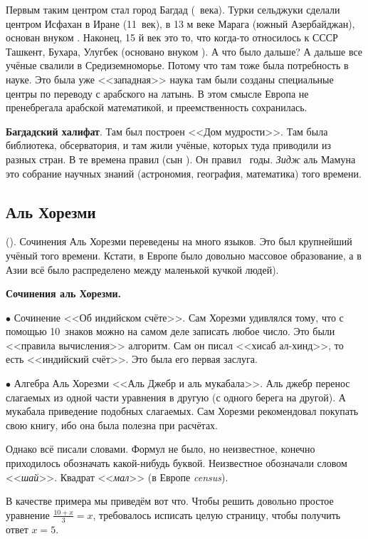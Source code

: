 \documentclass[a4paper,oneside,fleqn,10pt]{article}
\begin{document}
Первым таким центром стал город Багдад (~века). Турки
сельджуки сделали центром Исфахан в Иране (11~век), в 13 м веке Марага
(южный Азербайджан), основан внуком .
Наконец, 15 й век это то, что когда-то относилось к СССР Ташкент,
Бухара, Улугбек (основано внуком ). А что было
дальше? А дальше все учёные свалили в Средиземноморье.  Потому что там
тоже была потребность в науке.  Это была уже <<западная>> наука там
были созданы специальные центры по переводу с арабского на латынь. В
этом смысле Европа не пренебрегала арабской математикой, и
преемственность сохранилась.

\textbf{Багдадский халифат}. Там был построен <<Дом мудрости>>. Там
была библиотека, обсерватория, и там жили учёные, которых туда
приводили из разных стран.  В те времена правил  (сын
).  Он правил
~годы. \emph{Зидж} аль Мамуна это собрание научных знаний
(астрономия, география, математика) того времени.

\subsection{Аль Хорезми}

 (). Сочинения Аль Хорезми переведены
на много языков. Это был крупнейший учёный того времени. Кстати, в
Европе было довольно массовое образование, а в Азии всё было
распределено между маленькой кучкой людей).

\textbf{Сочинения аль Хорезми.}

$\bullet$ Сочинение <<Об индийском счёте>>. Сам Хорезми удивлялся
тому, что с помощью 10~знаков можно на самом деле записать любое
число.  Это были <<правила вычисления>> алгоритм.  Сам он писал
<<хисаб ал-хинд>>, то есть <<индийский счёт>>. Это была его первая
заслуга.

$\bullet$ Алгебра Аль Хорезми <<Аль Джебр и аль мукабала>>.  Аль джебр
перенос слагаемых из одной части уравнения в другую (с одного берега
на другой).  А мукабала приведение подобных слагаемых.  Сам Хорезми
рекомендовал покупать свою книгу, ибо она была полезна при расчётах.

Однако всё писали словами. Формул не было, но неизвестное, конечно
приходилось обозначать какой-нибудь буквой. Неизвестное обозначали
словом <<\emph{шай}>>.  Квадрат <<\emph{мал}>> (в Европе
\emph{census}).

В качестве примера мы приведём вот что. Чтобы решить довольно простое
уравнение $\frac{10+x}{3} = x$, требовалось исписать целую страницу,
чтобы получить ответ $x =5$.
\end{document}
